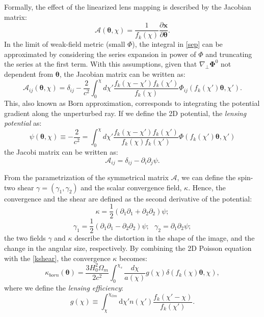 \documentclass[twocolumn,twocolappendix]{aastex63}
\begin{document}
Formally, the effect of the linearized lens mapping is described by the Jacobian matrix:
\begin{equation}
\mathcal{A}(\boldsymbol{\theta},\chi)=
\frac{1}{f_{k}(\chi)}
\frac{\partial \textbf{x}}{\partial \boldsymbol{\theta}}.
\end{equation}
In the limit of weak-field metric (small $\Phi$), the integral in \autoref{sep} can be approximated by considering the series expansion in power of $\Phi$ and truncating the series at the first term.
With this assumptions, given that $\nabla_{\bot}\boldsymbol{\Phi}^0$ not dependent from $\boldsymbol{\theta}$, the Jacobian matrix can be written as:
\begin{equation}
    \mathcal{A}_{ij}(\boldsymbol{\theta},\chi)
     =\delta_{ij}-\frac{2}{c^2}
    \int_0^{\chi} d\chi'
     \frac{f_k(\chi-\chi')f_k(\chi')}{f_k(\chi)}
     \Phi_{ij}(f_k(\chi')\boldsymbol{\theta},\chi').
\end{equation}
This, also known as Born approximation, corresponds to integrating the potential gradient along the unperturbed ray.
If we define the 2D potential, the \textit{lensing potential} as:
\begin{equation}
    \psi(\boldsymbol{\theta},\chi) \equiv
 -\frac{2}{c^2}
= \int_0^{\chi} d\chi'
   \frac{f_k(\chi-\chi')f_k(\chi')}{f_k(\chi)f_k(\chi')}
  \Phi(f_k(\chi')\boldsymbol{\theta},\chi')
\end{equation}
 the Jacobi matrix can be written as:
\begin{equation}
    \mathcal{A}_{ij}=\delta_{ij}-\partial_i \partial_j\psi.
\end{equation}

From the parametrization of the symmetrical matrix $\mathcal{A}$, we can define the spin-two shear $\gamma=(\gamma_1,\gamma_2)$ and the scalar convergence field, $\kappa$. 
Hence, the convergence and the shear are defined as the second derivative of the potential:
\begin{equation}\label{kshear}
    \kappa=\frac{1}{2}(\partial_1\partial_1+\partial_2\partial_2)\psi;  
\end{equation}
\begin{equation}
 \gamma_1=\frac{1}{2}(\partial_1\partial_1-\partial_2\partial_2)\psi; \  \  \
 \gamma_2=\partial_1\partial_2\psi;   
\end{equation}
the two fields $\gamma$ and $\kappa$ describe the distortion in the shape of the image, and the change in the angular size, respectively.
By combining the 2D Poisson equation with the \autoref{kshear}, the convergence $\kappa$ becomes:
\begin{equation}\label{born_approx}
    \kappa_{born}(\boldsymbol{\theta})= \frac{3H_0^2 \Omega_m}{2c^2}
    \int_0^{\chi_s} 
    \frac{d\chi}{a(\chi)}
    g(\chi)
    \delta(f_k(\chi)\boldsymbol{\theta},\chi),
\end{equation}
where we define the \textit{lensing efficiency}:
\begin{equation}
   g(\chi) \equiv
  \int_{\chi}^{\chi_{lim}} \text{d}\chi'
   n(\chi')
    \frac{f_k(\chi'-\chi)}{f_k(\chi')}.
\end{equation}
\end{document}
